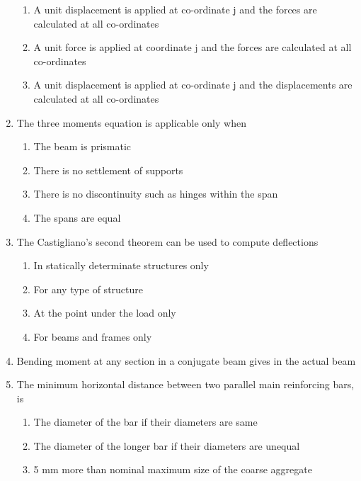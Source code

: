 \documentclass[11pt,a4paper]{article}
\begin{document}
\begin{enumerate}
\begin{enumerate}[label=\Alph*.]
\item{A unit displacement is applied at co-ordinate j and the forces are calculated at all co-ordinates}
\item{A unit force is applied at coordinate j and the forces are calculated at all co-ordinates}
\item{A unit displacement is applied at co-ordinate j and the displacements are calculated at all co-ordinates}
\end{enumerate}
\item{The three moments equation is applicable only when}
\begin{enumerate}[label=\Alph*.]
\item{The beam is prismatic}
\item{There is no settlement of supports}
\item{There is no discontinuity such as hinges within the span}
\item{The spans are equal}
\end{enumerate}
\item{The Castigliano's second theorem can be used to compute deflections}
\begin{enumerate}[label=\Alph*.]
\item{In statically determinate structures only}
\item{For any type of structure}
\item{At the point under the load only}
\item{For beams and frames only}
\end{enumerate}
\item{Bending moment at any section in a conjugate beam gives in the actual beam}
\\
\item{The minimum horizontal distance between two parallel main reinforcing bars, is}
\begin{enumerate}[label=\Alph*.]
\item{The diameter of the bar if their diameters are same}
\item{The diameter of the longer bar if their diameters are unequal}
\item{5 mm more than nominal maximum size of the coarse aggregate}

\end{enumerate}
\end{enumerate}
\end{document}
